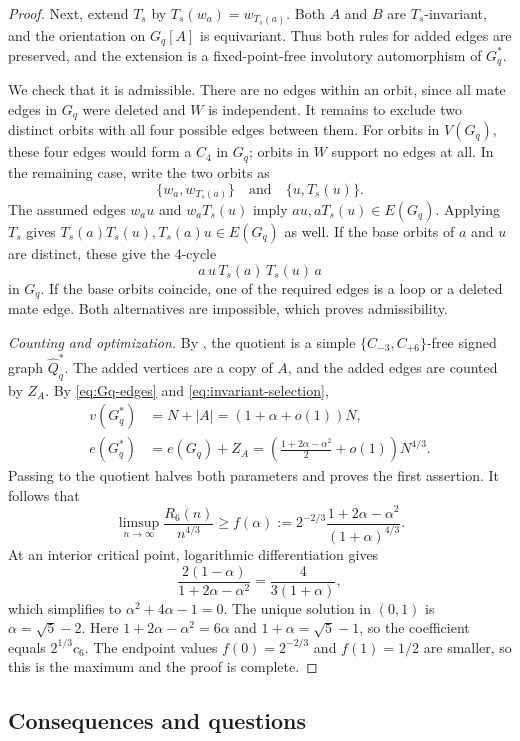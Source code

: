 \documentclass{article}
\theoremstyle{definition}
\theoremstyle{remark}
\begin{document}
\begin{proof}
Next, extend $T_s$ by $T_s(w_a)=w_{T_s(a)}$.  Both $A$ and $B$ are
$T_s$-invariant, and the orientation on $G_q[A]$ is equivariant.  Thus
both rules for added edges are preserved, and the extension is a
fixed-point-free involutory automorphism of $G_q^*$.

We check that it is admissible.  There are no edges within an orbit,
since all mate edges in $G_q$ were deleted and $W$ is independent.
It remains to exclude two distinct orbits with all four possible edges
between them.  For orbits in $V(G_q)$, these four edges would form a
$C_4$ in $G_q$; orbits in $W$ support no edges at all.  In the remaining
case, write the two orbits as
\[
\{w_a,w_{T_s(a)}\}\quad\text{and}\quad\{u,T_s(u)\}.
\]
The assumed edges $w_au$ and $w_aT_s(u)$ imply
$au,aT_s(u)\in E(G_q)$.  Applying $T_s$ gives
$T_s(a)T_s(u),T_s(a)u\in E(G_q)$ as well.  If the base orbits of
$a$ and $u$ are distinct, these give the $4$-cycle
\[
a\,u\,T_s(a)\,T_s(u)\,a
\]
in $G_q$.  If the base orbits coincide, one of the required edges is a
loop or a deleted mate edge.  Both alternatives are impossible, which
proves admissibility.

\emph{Counting and optimization.}
By , the quotient is a
simple $\{C_{-3},C_{+6}\}$-free signed graph $\widehat Q_q^*$.
The added vertices are a copy of $A$, and the added edges are counted by
$Z_A$.  By \eqref{eq:Gq-edges} and \eqref{eq:invariant-selection},
\begin{align*}
v(G_q^*)&=N+|A|=(1+\alpha+o(1))N,\\
e(G_q^*)&=e(G_q)+Z_A=
\left(\frac{1+2\alpha-\alpha^2}{2}+o(1)\right)N^{4/3}.
\end{align*}
Passing to the quotient halves both parameters and proves the first
assertion.  It follows that
\[
\limsup_{n\to\infty}\frac{R_6(n)}{n^{4/3}}
\geq f(\alpha):=
2^{-2/3}\frac{1+2\alpha-\alpha^2}{(1+\alpha)^{4/3}}.
\]
At an interior critical point, logarithmic differentiation gives
\[
\frac{2(1-\alpha)}{1+2\alpha-\alpha^2}
=\frac4{3(1+\alpha)},
\]
which simplifies to $\alpha^2+4\alpha-1=0$.  The unique solution in $(0,1)$ is
$\alpha=\sqrt5-2$.  Here $1+2\alpha-\alpha^2=6\alpha$ and
$1+\alpha=\sqrt5-1$, so the coefficient equals $2^{1/3}c_6$.
The endpoint values $f(0)=2^{-2/3}$ and $f(1)=1/2$ are smaller, so this
is the maximum and the proof is complete.
\end{proof}

\subsection{Consequences and questions}
\end{document}
